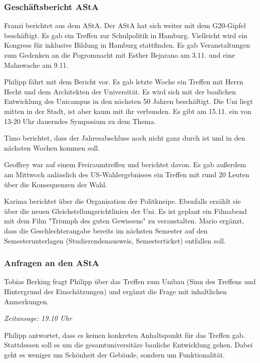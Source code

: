 \documentclass[ngerman,headheight=70pt]{scrartcl}
\begin{document}
    \subsubsection{Geschäftsbericht AStA}

    Franzi berichtet aus dem AStA. Der AStA hat sich weiter mit dem G20-Gipfel
    beschäftigt. Es gab ein Treffen zur Schulpolitik in Hamburg. Vielleicht wird
    ein Kongress für inklusive Bildung in Hamburg stattfinden. Es gab Veranstaltungen
    zum Gedenken an die Pogromnacht mit Esther Bejarano am 3.11. und eine Mahnwache
    am 9.11.

    Philipp fährt mit dem Bericht vor. Es gab letzte Woche ein Treffen mit Herrn
    Hecht und dem Architekten der Universität. Es wird sich mit der baulichen
    Entwicklung des Unicampus in den nächsten 50 Jahren beschäftigt. Die Uni liegt
    mitten in der Stadt, ist aber kaum mit ihr verbunden. Es gibt am 15.11. ein
    von 13-20 Uhr dauerndes Symposium zu dem Thema.

    Timo berichtet, dass der Jahresabschluss noch nicht ganz durch ist und in den
    nächsten Wochen kommen soll.

    Geoffrey war auf einem Freiraumtreffen und berichtet davon. Es gab außerdem
    am Mittwoch anlässlich des US-Wahlergebnisses ein Treffen mit rund 20 Leuten
    über die Konsequenzen der Wahl.

    Karima berichtet über die Organisation der Politkneipe. Ebenfalls erzählt sie
    über die neuen Gleichstellungsrichtlinien der Uni. Es ist geplant ein Filmabend
    mit dem Film "Triumph des guten Gewissens" zu veranstalten.
    Mario ergänzt, dass die Geschlechterangabe bereits im nächsten Semester auf
    den Semesterunterlagen (Studierendenausweis, Semesterticket) entfallen
    soll.

    \subsubsection{Anfragen an den AStA}

    Tobias Berking fragt Philipp über das Treffen zum Unibau (Sinn des Treffens
    und Hintergrund der Einschätzungen) und ergänzt die Frage
    mit inhaltlichen Anmerkungen.

    \textit{Zeitansage: 19.10 Uhr}

    Philipp antwortet, dass es keinen konkreten Anhaltspunkt für das Treffen gab.
    Stattdessen soll es um die gesamtuniversitäre bauliche Entwicklung gehen.
    Dabei geht es weniger um Schönheit der Gebäude, sondern um Funktionalität.
\end{document}
